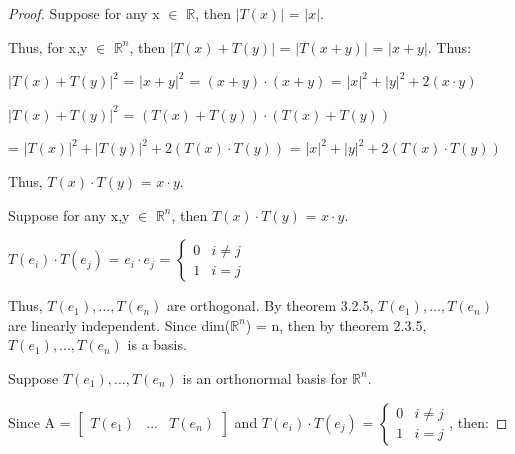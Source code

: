     \begin{proof}
        Suppose for any x $\in$ $\mathbb{R}$, then $|T(x)|$ = $|x|$.

        Thus, for x,y $\in$ $\mathbb{R}^n$,
        then $|T(x) + T(y)|$ = $|T(x+y)|$ = $|x+y|$. Thus:

        \hspace{0.5cm}
        $|T(x) + T(y)|^2$
        = $|x+y|^2$
        = $(x+y) \cdot (x+y)$
        = $|x|^2 + |y|^2 + 2(x \cdot y)$

        \hspace{0.5cm}
        $|T(x) + T(y)|^2$
        = $(T(x) + T(y)) \cdot (T(x) + T(y))$
        
        \hspace{3.2cm}
        = $|T(x)|^2 + |T(y)|^2 + 2(T(x) \cdot T(y))$
        = $|x|^2 + |y|^2 + 2(T(x) \cdot T(y))$

        Thus, $T(x) \cdot T(y)$ = $x \cdot y$.

        \vspace{0.3cm}

        Suppose for any x,y $\in$ $\mathbb{R}^n$, then
        $T(x) \cdot T(y)$ = $x \cdot y$.

        \hspace{0.5cm}
        $T(e_i) \cdot T(e_j)$
        = $e_i \cdot e_j$ =
        $\begin{cases}
            0 & i \not = j \\
            1 & i = j
        \end{cases}$

        Thus, $T(e_1),...,T(e_n)$ are orthogonal.
        By {\color{red} theorem 3.2.5}, $T(e_1),...,T(e_n)$
        are linearly independent. Since dim($\mathbb{R}^n$) = n,
        then by {\color{red} theorem 2.3.5}, $T(e_1),...,T(e_n)$ is a basis.

        \vspace{0.3cm}

        Suppose $T(e_1),...,T(e_n)$ is an orthonormal basis for $\mathbb{R}^n$.

        Since A =
        $\begin{bmatrix}
            T(e_1) & ... & T(e_n)
        \end{bmatrix}$ and
        $T(e_i) \cdot T(e_j)$ =
        $\begin{cases}
            0 & i \not = j \\
            1 & i = j
        \end{cases}$, then:


\end{proof}
